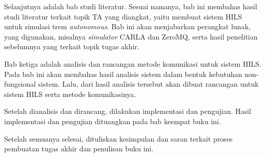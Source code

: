 Selanjutnya adalah bab studi literatur. Sesuai namanya, bab ini membahas hasil
studi literatur terkait topik TA yang diangkat, yaitu membuat sistem HILS untuk
simulasi trem \textit{autonomous}. Bab ini akan menjabarkan perangkat lunak, yang
digunakan, misalnya \textit{simulator} CARLA dan ZeroMQ, serta hasil penelitian
sebelumnya yang terkait topik tugas akhir.

Bab ketiga adalah analisis dan rancangan metode komunikasi untuk sistem HILS.
Pada bab ini akan membahas hasil analisis sistem dalam bentuk kebutuhan
non-fungsional sistem. Lalu, dari hasil analisis tersebut akan dibuat rancangan
untuk sistem HILS serta metode komunikasinya.

Setelah dianalisis dan dirancang, dilakukan implementasi dan pengujian. Hasil
implementasi dan pengujian dituangkan pada bab keempat buku ini.

Setelah semuanya selesai, dituliskan kesimpulan dan saran terkait proses
pembuatan tugas akhir dan penulisan buku ini.